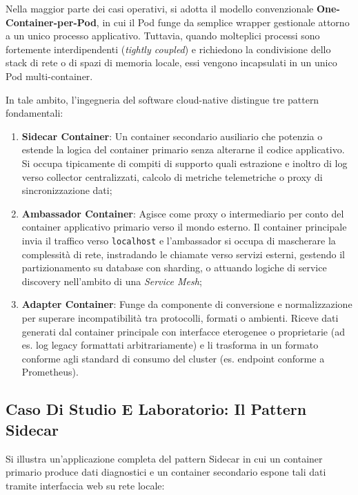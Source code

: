 \documentclass[11pt, a4paper]{article}
\begin{document}

Nella maggior parte dei casi operativi, si adotta il modello convenzionale \textbf{One-Container-per-Pod}, in cui il Pod funge da semplice wrapper gestionale attorno a un unico processo applicativo. Tuttavia, quando molteplici processi sono fortemente interdipendenti (\emph{tightly coupled}) e richiedono la condivisione dello stack di rete o di spazi di memoria locale, essi vengono incapsulati in un unico Pod multi-container.

In tale ambito, l'ingegneria del software cloud-native distingue tre pattern fondamentali:
\begin{enumerate}[noitemsep]
    \item \textbf{Sidecar Container}: Un container secondario ausiliario che potenzia o estende la logica del container primario senza alterarne il codice applicativo. Si occupa tipicamente di compiti di supporto quali estrazione e inoltro di log verso collector centralizzati, calcolo di metriche telemetriche o proxy di sincronizzazione dati;
    \item \textbf{Ambassador Container}: Agisce come proxy o intermediario per conto del container applicativo primario verso il mondo esterno. Il container principale invia il traffico verso \texttt{localhost} e l'ambassador si occupa di mascherare la complessità di rete, instradando le chiamate verso servizi esterni, gestendo il partizionamento su database con sharding, o attuando logiche di service discovery nell'ambito di una \emph{Service Mesh};
    \item \textbf{Adapter Container}: Funge da componente di conversione e normalizzazione per superare incompatibilità tra protocolli, formati o ambienti. Riceve dati generati dal container principale con interfacce eterogenee o proprietarie (ad es. log legacy formattati arbitrariamente) e li trasforma in un formato conforme agli standard di consumo del cluster (es. endpoint conforme a Prometheus).
\end{enumerate}

\subsection{Caso Di Studio E Laboratorio: Il Pattern Sidecar}
Si illustra un'applicazione completa del pattern Sidecar in cui un container primario produce dati diagnostici e un container secondario espone tali dati tramite interfaccia web su rete locale:
\end{document}
